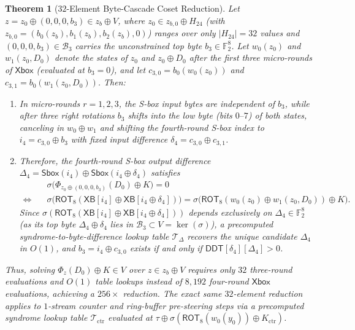 \documentclass[11pt,a4paper]{article}
\newtheorem{theorem}{Theorem}
\theoremstyle{definition}
\theoremstyle{remark}
\newcommand{\Ftwo}{\mathbb{F}_2}
\newcommand{\Xbox}{\mathsf{Xbox}}
\newcommand{\Sbox}{\mathsf{Sbox}}
\newcommand{\ROT}{\mathsf{ROT}_8}
\begin{document}
\begin{theorem}[$32$-Element Byte-Cascade Coset Reduction]
\label{thm:byte-cascade}
Let $z = z_0 \oplus (0, 0, 0, b_3) \in z_b \oplus V$, where $z_0 \in z_{b,0} \oplus H_{24}$ (with $z_{b,0} = (b_0(z_b), b_1(z_b), b_2(z_b), 0)$) ranges over only $|H_{24}| = 32$ values and $(0, 0, 0, b_3) \in \mathcal{B}_3$ carries the unconstrained top byte $b_3 \in \Ftwo^8$. Let $w_0(z_0)$ and $w_1(z_0, D_0)$ denote the states of $z_0$ and $z_0 \oplus D_0$ after the first three micro-rounds of $\Xbox$ (evaluated at $b_3 = 0$), and let $c_{3,0} = b_0(w_0(z_0))$ and $c_{3,1} = b_0(w_1(z_0, D_0))$. Then:
\begin{enumerate}[leftmargin=2em]
    \item In micro-rounds $r = 1, 2, 3$, the S-box input bytes are independent of $b_3$, while after three right rotations $b_3$ shifts into the low byte (bits $0\text{--}7$) of both states, canceling in $w_0 \oplus w_1$ and shifting the fourth-round S-box index to $i_4 = c_{3,0} \oplus b_3$ with fixed input difference $\delta_4 = c_{3,0} \oplus c_{3,1}$.
    \item Therefore, the fourth-round S-box output difference $\Delta_4 = \Sbox(i_4) \oplus \Sbox(i_4 \oplus \delta_4)$ satisfies
    \[
    \begin{aligned}
    &\sigma\!\big(\Phi_{z_0 \oplus (0, 0, 0, b_3)}(D_0) \oplus K\big) = 0 \\
    \Longleftrightarrow \quad
    &\sigma\!\big(\ROT(\mathsf{XB}[i_4] \oplus \mathsf{XB}[i_4 \oplus \delta_4])\big) = \sigma\!\big(\ROT(w_0(z_0) \oplus w_1(z_0, D_0)) \oplus K\big).
    \end{aligned}
    \]
    Since $\sigma(\ROT(\mathsf{XB}[i_4] \oplus \mathsf{XB}[i_4 \oplus \delta_4]))$ depends exclusively on $\Delta_4 \in \Ftwo^8$ (as its top byte $\Delta_4 \oplus \delta_4$ lies in $\mathcal{B}_3 \subset V = \ker(\sigma)$), a precomputed syndrome-to-byte-difference lookup table $\mathcal{T}_{\Delta}$ recovers the unique candidate $\Delta_4$ in $O(1)$, and $b_3 = i_4 \oplus c_{3,0}$ exists if and only if $\mathsf{DDT}[\delta_4][\Delta_4] > 0$.
\end{enumerate}
Thus, solving $\Phi_z(D_0) \oplus K \in V$ over $z \in z_b \oplus V$ requires only $32$ three-round evaluations and $O(1)$ table lookups instead of $8{,}192$ four-round $\Xbox$ evaluations, achieving a $256\times$ reduction. The exact same $32$-element reduction applies to $1$-stream counter and ring-buffer pre-steering steps via a precomputed syndrome lookup table $\mathcal{T}_{\mathrm{ctr}}$ evaluated at $\tau \oplus \sigma(\ROT(w_0(y_0)) \oplus K_{\mathrm{ctr}})$.
\end{theorem}
\end{document}
